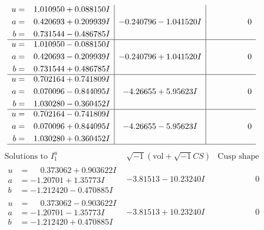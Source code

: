 \documentclass[1p]{elsarticle_modified}
\theoremstyle{definition}
\newcommand{\I}{\sqrt{-1}}
\begin{document}
$$\begin{array}{c|c|c}
\begin{aligned}
u &= \phantom{-}1.010950 + 0.088150 I \\
a &= \phantom{-}0.420693 + 0.209939 I \\
b &= \phantom{-}0.731544 - 0.486785 I\end{aligned}
 & -0.240796 - 1.041520 I & \phantom{-0.000000 } 0 \\ \hline\begin{aligned}
u &= \phantom{-}1.010950 - 0.088150 I \\
a &= \phantom{-}0.420693 - 0.209939 I \\
b &= \phantom{-}0.731544 + 0.486785 I\end{aligned}
 & -0.240796 + 1.041520 I & \phantom{-0.000000 } 0 \\ \hline\begin{aligned}
u &= \phantom{-}0.702164 + 0.741809 I \\
a &= \phantom{-}0.070096 - 0.844095 I \\
b &= \phantom{-}1.030280 - 0.360452 I\end{aligned}
 & -4.26655 + 5.95623 I & \phantom{-0.000000 } 0 \\ \hline\begin{aligned}
u &= \phantom{-}0.702164 - 0.741809 I \\
a &= \phantom{-}0.070096 + 0.844095 I \\
b &= \phantom{-}1.030280 + 0.360452 I\end{aligned}
 & -4.26655 - 5.95623 I & \phantom{-0.000000 } 0\\
 \hline 
 \end{array}$$\newpage$$\begin{array}{c|c|c}  
\text{Solutions to }I^u_{1}& \I (\text{vol} + \sqrt{-1}CS) & \text{Cusp shape}\\
 \hline 
\begin{aligned}
u &= \phantom{-}0.373062 + 0.903622 I \\
a &= -1.20701 + 1.35773 I \\
b &= -1.212420 - 0.470885 I\end{aligned}
 & -3.81513 - 10.23240 I & \phantom{-0.000000 } 0 \\ \hline\begin{aligned}
u &= \phantom{-}0.373062 - 0.903622 I \\
a &= -1.20701 - 1.35773 I \\
b &= -1.212420 + 0.470885 I\end{aligned}
 & -3.81513 + 10.23240 I & \phantom{-0.000000 } 0 \\ \hline\begin{aligned}

\end{aligned}
\end{array}$$
\end{document}
